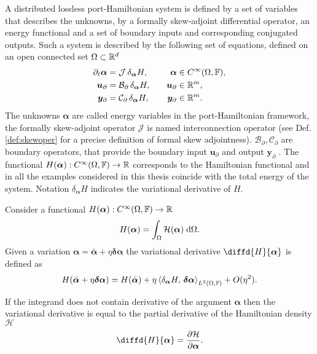 A distributed lossless port-Hamiltonian system is defined by a set of variables that describes the unknowns, by a formally skew-adjoint differential operator, an energy functional and a set of boundary inputs and corresponding conjugated outputs. Such a system is described by the following set of equations, defined on an open connected set $\Omega \subset \bbR^d$
\begin{equation}\label{eq:phsys}
\begin{aligned}
\partial_t {\bm{\alpha}} &= \mathcal{J} \, \delta_{\bm{\alpha}}{H}, \\
\bm{u}_\partial &= \mathcal{B}_\partial  \, \delta_{\bm{\alpha}}{H}, \\
\bm{y}_\partial &= \mathcal{C}_\partial \, \delta_{\bm{\alpha}}{H}, 
\end{aligned} \qquad
\begin{aligned}
{\bm{\alpha}} &\in C^\infty(\Omega, \bbF),\\
\bm{u}_\partial &\in \bbR^m, \\
\bm{y}_\partial &\in \bbR^m. 
\end{aligned}
\end{equation}
The unknowns $\bm{\alpha}$ are called energy variables in the port-Hamiltonian framework, the formally skew-adjoint operator $\mathcal{J}$ is named interconnection operator (see Def. \ref{def:skewoper} for a precise definition of formal skew adjointness). $\mathcal{B}_\partial, \mathcal{C}_\partial$ are boundary operators, that provide the boundary input $\bm{u}_\partial$ and output $\bm{y}_\partial$ \cite[Chapter 4]{tucsnak2009observation}. The functional $H(\bm{\alpha}): C^\infty(\Omega, \bbF) \rightarrow \bbR$ corresponds to the Hamiltonian functional and in all the examples considered in this thesis coincide with the total energy of the system. Notation $\delta_{\bm{\alpha}}{H}$ indicates the variational derivative of $H$.

\begin{definition}
Consider a functional $H(\bm{\alpha}): C^\infty(\Omega, \bbF) \rightarrow \bbR$
\begin{equation*} 
H(\bm{\alpha}) = \int_{\Omega} \mathcal{H}(\bm{\alpha}) \d{\Omega}.
\end{equation*}
Given a variation $\bm{\alpha} = \bar{\bm{\alpha}} + \eta \bm{\delta\alpha}$ the variational derivative $\diffd{H}{\bm{\alpha}}$ is defined as
\begin{equation*}
H(\bar{\bm{\alpha}} + \eta \bm{\delta\alpha}) = H(\bar{\bm{\alpha}}) + \eta \inner[L^2(\Omega, \bbF)]{\delta_{\bm{\alpha}}{H}}{\bm{\delta\alpha}} + O(\eta^2).
\end{equation*}
\end{definition}
\begin{remark}
If the integrand does not contain derivative of the argument $\bm{\alpha}$ then the variational derivative is equal to the partial derivative of the Hamiltonian density $\mathcal{H}$
\begin{equation*}
\diffd{H}{\bm{\alpha}} = \diffp{\mathcal{H}}{\bm{\alpha}}.
\end{equation*}
\end{remark}

